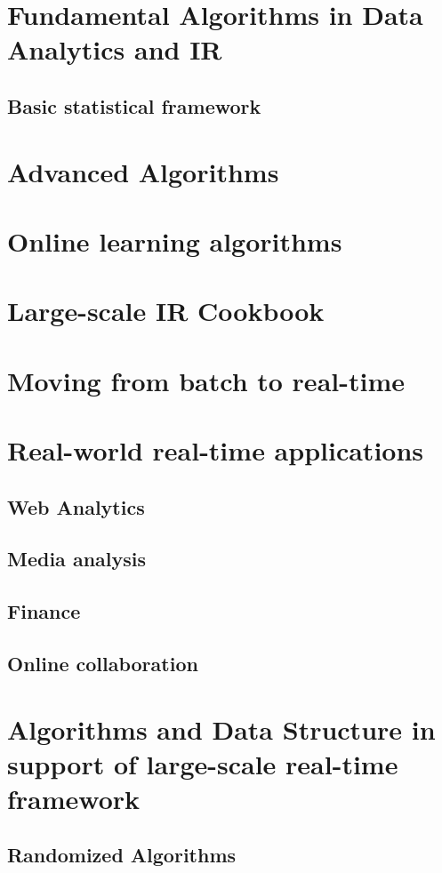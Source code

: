 \documentclass[]{book}    %
\begin{document}
\chapter{Fundamental Algorithms in Data Analytics and IR}
\section{Basic statistical framework}

\chapter{Advanced Algorithms}
\chapter{Online learning algorithms}

\chapter{Large-scale IR Cookbook}

\chapter{Moving from batch to real-time}

\chapter{Real-world real-time applications}
\section{Web Analytics}
\section{Media analysis}
\section{Finance}
\section{Online collaboration}

\chapter{Algorithms and Data Structure in support of large-scale real-time framework}
\section{Randomized Algorithms}
\end{document}
